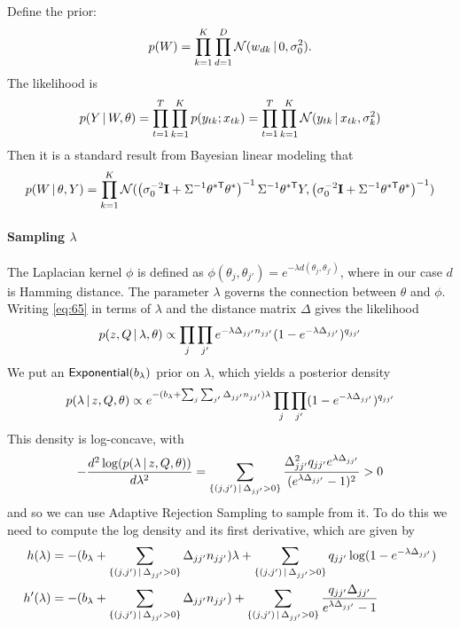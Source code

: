Define the prior:
\begin{equation}
  \label{eq:78}
  p(W) = \prod_{k=1}^K\prod_{d=1}^D \mathcal{N}(w_{dk} \, \vert \, 0,\sigma^2_0).
\end{equation}
The likelihood is
\begin{equation}
  \label{eq:79}
  p(Y \, \vert \, W, \theta) = \prod_{t=1}^T \prod_{k=1}^K p(y_{tk}; x_{tk}) = \prod_{t=1}^T \prod_{k=1}^K \mathcal{N}(y_{tk} \, \vert \, x_{tk},\sigma^2_k)
\end{equation}
Then it is a standard result from Bayesian linear modeling that
\begin{equation}
  \label{eq:80}
  p(W \, \vert \, \theta, Y) = \prod_{k=1}^K
  \mathcal{N}(\left(\sigma_0^{-2} \mathbf{I} + \Sigma^{-1} \theta^{*\mathsf{T}} \theta^*
    \right)^{-1}\Sigma^{-1} \theta^{*\mathsf{T}} Y,\left(\sigma_0^{-2} \mathbf{I} + \Sigma^{-1} \theta^{*\mathsf{T}} \theta^{*}\right)^{-1})
\end{equation}

\paragraph{Sampling $\lambda$}
\label{sec:sampling-lambda}
The Laplacian kernel $\phi$ is defined as $\phi(\theta_j, \theta_{j'}) =
e^{-\lambda d(\theta_j,\theta_{j'})}$, where in our case $d$ is
  Hamming distance.  The parameter $\lambda$ governs the connection between $\theta$ and
$\phi$.  Writing \eqref{eq:65} in terms of $\lambda$ and the distance matrix
$\Delta$ gives the likelihood
\begin{equation}
  \label{eq:88}
  p(z, Q \, \vert \, \lambda, \theta) \propto \prod_{j}\prod_{j'}
  e^{-\lambda \Delta_{jj'} n_{jj'}}(1-e^{-\lambda\Delta_{jj'}})^{q_{jj'}} 
\end{equation}
We put an $\mathsf{Exponential}(b_{\lambda})$ prior on $\lambda$, which yields a
posterior density
\begin{equation}
  \label{eq:88}
  p(\lambda \, \vert \, z, Q, \theta) \propto
  e^{-(b_{\lambda} + \sum_{j}\sum_{j'} \Delta_{jj'} n_{jj'})\lambda} \prod_{j}\prod_{j'}
  (1-e^{-\lambda\Delta_{jj'}})^{q_{jj'}}
\end{equation}
This density is log-concave, with
\begin{equation}
  \label{eq:90}
  -\frac{d^2\log(p(\lambda \, \vert \, z, Q,
    \theta))}{d\lambda^2} = \sum_{\{(j,j') \, \vert \,
    \Delta_{jj'} > 0\}}
  \frac{\Delta_{jj'}^2 q_{jj'}
    e^{\lambda\Delta_{jj'}}}{(e^{\lambda\Delta_{jj'}} - 1)^2} > 0
\end{equation}
and so we can use Adaptive Rejection Sampling \citep{gilks1992adaptive}
to sample from it.  To do this we need to compute the log density and its first derivative, which are given by
\begin{align}
  \label{eq:94}
  h(\lambda) &= 
  -(b_{\lambda} + \sum_{\{(j,j') \, \vert \, \Delta_{jj'} > 0\}} \Delta_{jj'} n_{jj'})\lambda +
  \sum_{\{(j,j') \, \vert \, \Delta_{jj'} > 0\}} q_{jj'} \log(1 - e^{-\lambda\Delta_{jj'}}) \\
  h'(\lambda) &= -(b_{\lambda} + \sum_{\{(j,j') \, \vert \, \Delta_{jj'} > 0\}} \Delta_{jj'}
  n_{jj'}) + \sum_{\{(j,j') \, \vert \, \Delta_{jj'} > 0\}}
  \frac{q_{jj'}\Delta_{jj'}}{e^{\lambda\Delta_{jj'}} - 1}
\end{align}

